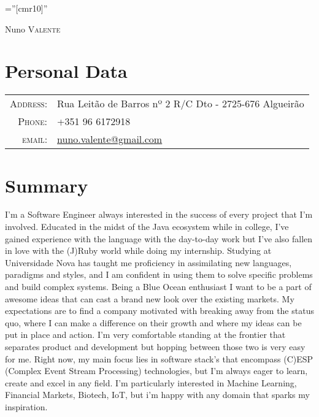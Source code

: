 \documentclass[a4paper,10pt]{article}
\begin{document}
\pagestyle{empty} %

\font\fb=''[cmr10]'' %

\par{\centering
  {\Huge Nuno \textsc{Valente}
}\bigskip\par}

\section{Personal Data}
\begin{tabular}{rl}
    \textsc{Address:}   & Rua Leitão de Barros nº 2 R/C Dto - 2725-676 Algueirão\\
    \textsc{Phone:}     & +351 96 6172918\\
    \textsc{email:}     & \href{mailto:nuno.valente@gmail.com}{nuno.valente@gmail.com} \\
\end{tabular}

\section{Summary}
I'm a Software Engineer always interested in the success of every project that I'm involved.
Educated in the midst of the Java ecosystem while in college, I've gained experience with the language with the day-to-day work but I've also fallen in love with the (J)Ruby world while doing my internship.
Studying at Universidade Nova has taught me proficiency in assimilating new languages, paradigms and styles, and I am confident in using them to solve specific problems and build complex systems.
Being a Blue Ocean enthusiast I want to be a part of awesome ideas that can cast a brand new look over the existing markets.
My expectations are to find a company motivated with breaking away from the status quo, where I can make a difference on their growth and where my ideas can be put in place and action.
I'm very comfortable standing at the frontier that separates product and development but hopping between those two is very easy for me.
Right now, my main focus lies in software stack's that encompass (C)ESP (Complex Event Stream Processing) technologies, but I’m always eager to learn, create and excel in any field. 
I'm particularly interested in Machine Learning, Financial Markets, Biotech, IoT, but i'm happy with any domain that sparks my inspiration.
\end{document}
